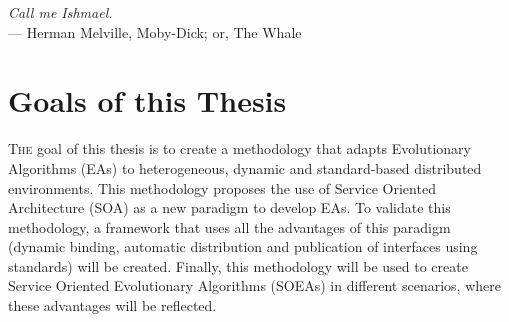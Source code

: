 \label{chap:introduction}
\begin{flushright}{\slshape
    Call me Ishmael.} \\ \medskip
    --- {Herman Melville, Moby-Dick; or, The Whale}
\end{flushright}
\minitoc\mtcskip
\vfill



\section{Goals of this Thesis} %


\lettrine{T}{he} goal of this thesis is to create a methodology that adapts Evolutionary Algorithms (EAs) to heterogeneous, dynamic and standard-based distributed environments. This methodology proposes the use of Service Oriented Architecture (SOA) as a new paradigm to develop EAs. To validate this methodology, a framework that uses all the advantages of this paradigm (dynamic binding, automatic distribution and publication of interfaces using standards) will be created. Finally, this methodology will be used to create Service Oriented Evolutionary Algorithms (SOEAs) in different scenarios, where these advantages will be reflected.

